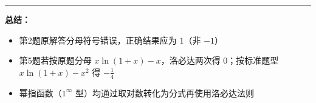 \documentclass[12pt, a4paper]{ctexart}
\begin{document}
\vspace{2em}
\noindent\rule{\textwidth}{0.4pt}
\noindent\textbf{总结：}
\begin{itemize}
    \item 第2题原解答分母符号错误，正确结果应为 $1$（非 $-1$）
    \item 第5题若按原题分母 $x\ln(1+x)-x$，洛必达两次得 $0$；按标准题型 $x\ln(1+x)-x^2$ 得 $-\frac{1}{4}$
    \item 幂指函数（$1^\infty$ 型）均通过取对数转化为分式再使用洛必达法则
\end{itemize}
\end{document}

